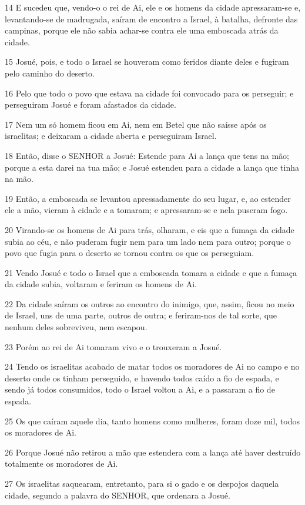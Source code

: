 \par 14 E sucedeu que, vendo-o o rei de Ai, ele e os homens da cidade apressaram-se e, levantando-se de madrugada, saíram de encontro a Israel, à batalha, defronte das campinas, porque ele não sabia achar-se contra ele uma emboscada atrás da cidade.
\par 15 Josué, pois, e todo o Israel se houveram como feridos diante deles e fugiram pelo caminho do deserto.
\par 16 Pelo que todo o povo que estava na cidade foi convocado para os perseguir; e perseguiram Josué e foram afastados da cidade.
\par 17 Nem um só homem ficou em Ai, nem em Betel que não saísse após os israelitas; e deixaram a cidade aberta e perseguiram Israel.
\par 18 Então, disse o SENHOR a Josué: Estende para Ai a lança que tens na mão; porque a esta darei na tua mão; e Josué estendeu para a cidade a lança que tinha na mão.
\par 19 Então, a emboscada se levantou apressadamente do seu lugar, e, ao estender ele a mão, vieram à cidade e a tomaram; e apressaram-se e nela puseram fogo.
\par 20 Virando-se os homens de Ai para trás, olharam, e eis que a fumaça da cidade subia ao céu, e não puderam fugir nem para um lado nem para outro; porque o povo que fugia para o deserto se tornou contra os que os perseguiam.
\par 21 Vendo Josué e todo o Israel que a emboscada tomara a cidade e que a fumaça da cidade subia, voltaram e feriram os homens de Ai.
\par 22 Da cidade saíram os outros ao encontro do inimigo, que, assim, ficou no meio de Israel, uns de uma parte, outros de outra; e feriram-nos de tal sorte, que nenhum deles sobreviveu, nem escapou.
\par 23 Porém ao rei de Ai tomaram vivo e o trouxeram a Josué.
\par 24 Tendo os israelitas acabado de matar todos os moradores de Ai no campo e no deserto onde os tinham perseguido, e havendo todos caído a fio de espada, e sendo já todos consumidos, todo o Israel voltou a Ai, e a passaram a fio de espada.
\par 25 Os que caíram aquele dia, tanto homens como mulheres, foram doze mil, todos os moradores de Ai.
\par 26 Porque Josué não retirou a mão que estendera com a lança até haver destruído totalmente os moradores de Ai.
\par 27 Os israelitas saquearam, entretanto, para si o gado e os despojos daquela cidade, segundo a palavra do SENHOR, que ordenara a Josué.
